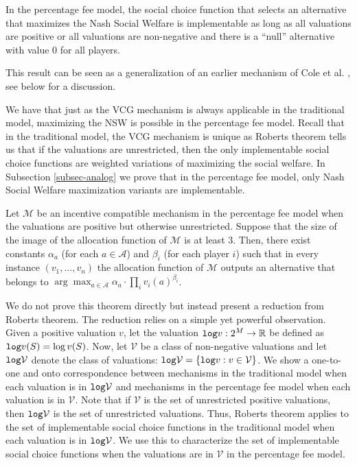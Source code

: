 \documentclass{theoretics}
\newcommand{\R}{\mathbb{R}}
\newcommand{\cM}{{\mathcal M}}
\newcommand{\cV}{{\mathcal V}}
\begin{document}
\begin{theorem*}
In the percentage fee model, the social choice function that selects an alternative that maximizes the Nash Social Welfare is implementable as long as all valuations are positive or all valuations are non-negative and there is a ``null'' alternative with value $0$ for all players. 
\end{theorem*}

{This result can be seen as a generalization of an earlier mechanism of Cole et al. \cite{CGG13}, see below for a discussion.}



We have that just as the VCG mechanism is always applicable in the traditional model, maximizing the NSW is  possible in the percentage fee model. Recall that in the traditional model, the VCG mechanism is unique as Roberts theorem tells us that if the valuations are unrestricted, then the only implementable social choice functions are weighted variations of maximizing the social welfare. In Subsection \ref{subsec-analog} we prove that in the percentage fee model, only Nash Social Welfare maximization variants are implementable.


\begin{theorem*}
Let $\mathcal M$ be an incentive compatible mechanism in the percentage fee model when the valuations are positive but otherwise unrestricted. Suppose that the size of the image of the allocation function of $\cM$ is at least $3$. Then, there exist constants $\alpha_a$ (for each $a\in \mathcal A$) and $\beta_i$ (for each player $i$) such that in every instance $(v_1,\ldots, v_n)$ the allocation function of $\cM$ outputs an alternative that belongs to $\arg\max_{a\in \mathcal A}\alpha_a\cdot \prod_iv_i(a)^{\beta_i}$. 
\end{theorem*}

 We do not prove this theorem directly but instead present a reduction from Roberts theorem. The reduction relies on a simple yet powerful observation. 
Given a positive valuation $v$, let the valuation ${\tt log} v:2^M \to \R$ be defined as ${\tt log} v(S) = \log v(S)$. Now, let $\cV$ be a class of non-negative valuations and let ${\tt log} \cV$ denote the class of valuations: $ {\tt log} \cV = \{ {\tt log} v: v \in \cV \}$. We show a one-to-one and onto correspondence between mechanisms in the traditional model when each valuation is in ${\tt log} \cV$ and mechanisms in the percentage fee model when each valuation is in $\cV$. Note that if $\cV$ is the set of unrestricted positive valuations, then ${\tt log} \cV$ is the set of unrestricted valuations. Thus, Roberts theorem applies to the set of implementable social choice functions in the traditional model when each valuation is in ${\tt log} \cV$. We use this to characterize the set of implementable social choice functions when the valuations are in $\cV$ in the percentage fee model. 
\end{document}
